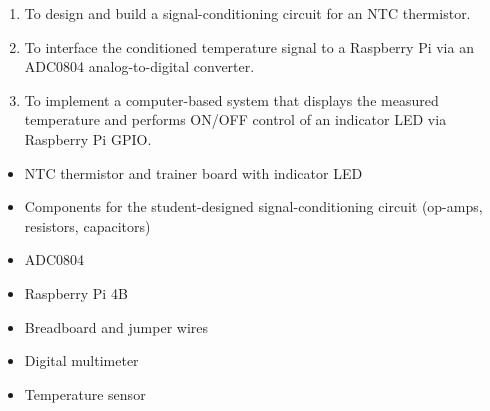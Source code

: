 
\begin{objectives}
  \begin{enumerate}
    \item To design and build a signal-conditioning circuit for an NTC thermistor.
    \item To interface the conditioned temperature signal to a Raspberry Pi via an ADC0804 analog-to-digital converter.
    \item To implement a computer-based system that displays the measured temperature and performs ON/OFF control of an indicator LED via Raspberry Pi GPIO.
  \end{enumerate}
\end{objectives}

\begin{equipment}
  \begin{itemize}
    \item NTC thermistor and trainer board with indicator LED
    \item Components for the student-designed signal-conditioning circuit (op-amps, resistors, capacitors)
    \item ADC0804
    \item Raspberry Pi 4B
    \item Breadboard and jumper wires
    \item Digital multimeter
    \item Temperature sensor
  \end{itemize}
\end{equipment}

